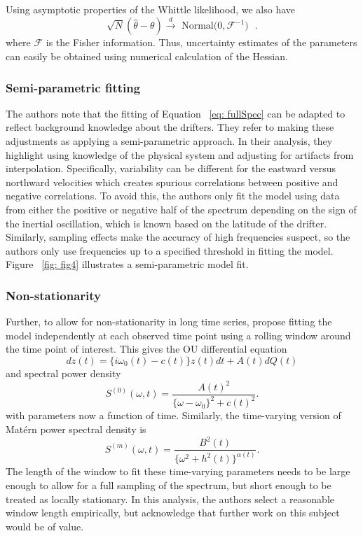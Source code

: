 \documentclass{stat572Style}
\begin{document}
Using asymptotic properties of the Whittle likelihood, we also have 
\begin{equation}
\label{eq: fisher}
\sqrt{N}(\hat{\theta} - \theta) \overset{d}{\rightarrow} \text{ Normal($0, \mathcal{F}^{-1})$ }.
\end{equation}
where $\mathcal{F}$ is the Fisher information. 
Thus, uncertainty estimates of the parameters can easily be obtained using numerical calculation of the Hessian. 

\subsubsection{Semi-parametric fitting}
\label{sec: semi}
The authors note that the fitting of Equation ~\ref{eq: fullSpec} can be adapted to reflect background knowledge about the drifters. 
They refer to making these adjustments as applying a semi-parametric approach. 
In their analysis, they highlight using knowledge of the physical system and adjusting for artifacts from interpolation. 
Specifically,  variability can be different for the eastward versus northward velocities  which creates spurious correlations between positive and negative correlations. 
To avoid this, the authors only fit the model using data from either the positive or negative half of the spectrum depending on the sign of the inertial oscillation, which is known based on the latitude of the drifter.  
Similarly, sampling effects make the accuracy of high frequencies suspect, so the authors only use frequencies up to a specified threshold in fitting the model. Figure ~\ref{fig: fig4} illustrates a semi-parametric model fit. 

\subsubsection{Non-stationarity}
Further, to allow for non-stationarity in long time series, \citep{Sykulski2016} propose fitting the model independently at each observed time point using a rolling window around the time point of interest. 
This gives the OU differential equation
\begin{equation}
dz(t) = \{i \omega_{0}(t) - c(t) \} z(t) dt + A(t) dQ(t)
\end{equation}
and spectral power density
\begin{equation}
S^{(0)}(\omega, t) = \frac{A(t)^{2}}{\{\omega - \omega_{0}\}^{2} + c(t)^{2}}. 
\end{equation}
with parameters now a function of time. 
Similarly, the time-varying version of Mat\'{e}rn power spectral density is 
\begin{equation}
S^{(m)}(\omega, t) = \frac{B^{2}(t)}{\{\omega^{2} + h^{2}(t)\}^{\alpha(t)}}.
\end{equation}
The length of the window to fit these time-varying parameters needs to be large enough to allow for a full sampling of the spectrum, but short enough to be treated as locally stationary. 
 In this analysis, the authors select a reasonable window length empirically, but acknowledge that further work on this subject would be of value.  
\end{document}
